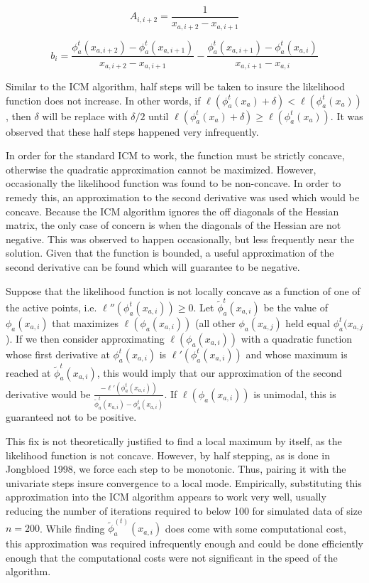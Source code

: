 \documentclass[10pt]{article}
\begin{document}
	\[ A_{i, i + 2} = \frac{1}{x_{a,i+2} - x_{a,i + 1} }
	\]
	
	\[ b_i = \frac{ \phi_a^{t}(x_{a, i + 2}) - \phi_a^{t}(x_{a, i + 1}) } {x_{a, i+2} - x_{a, i+1} }  -  \frac{ \phi_a^{t}(x_{a, i + 1}) - \phi_a^{t}(x_{a, i }) } {x_{a, i+1} - x_{a, i} } 
	\]
	
	Similar to the ICM algorithm, half steps will be taken to insure the likelihood function does not increase. In other words, if $\ell ( \phi^{t}_a(x_a) + \delta ) < \ell ( \phi^{t}_a(x_a) ) $, then $\delta$ will be replace with $\delta/2$ until $\ell ( \phi^{t}_a(x_a) + \delta ) \geq \ell ( \phi^{t}_a(x_a) )$. It was observed that these half steps happened very infrequently.
	
	
	
	In order for the standard ICM to work, the function must be strictly concave, otherwise the quadratic approximation cannot be maximized. However, occasionally the likelihood function was found to be non-concave. In order to remedy this, an approximation to the second derivative was used which would be concave. Because the ICM algorithm ignores the off diagonals of the Hessian matrix, the only case of concern is when the diagonals of the Hessian are not negative. This was observed to happen occasionally, but less frequently near the solution. Given that the function is bounded, a useful approximation of the second derivative can be found which will guarantee to be negative. 
	
	Suppose that the likelihood function is not locally concave as a function of one of the active points, i.e. $ \ell''(\phi_a^{t}(x_{a,i})) \geq 0$. Let $\tilde\phi_a^{t}(x_{a,i})$ be the value of $\phi_a(x_{a,i})$ that maximizes $\ell(\phi_a(x_{a,i}))$ (all other $\phi_a(x_{a,j})$ held equal $\phi_a^{t}(x_{a,j} $). If we then consider approximating $\ell(\phi_a(x_{a,i}))$ with a quadratic function whose first derivative at $\phi_a^{t}(x_{a,i})$ is $\ell'(\phi_a^{t}(x_{a,i}) ) $ and whose maximum is reached at $\tilde\phi_a^{t}(x_{a,i})$, this would imply that our approximation of the second derivative would be $\frac{-\ell'(\phi_a^{t}(x_{a,i}) )} {\tilde\phi_a^{t}(x_{a,i}) -\phi_a^{t}(x_{a,i})}$. If $\ell(\phi_a(x_{a,i}))$ is unimodal, this is guaranteed not to be positive. 
	
	This fix is not theoretically justified to find a local maximum by itself, as the likelihood function is not concave. However, by half stepping, as is done in Jongbloed 1998, we force each step to be monotonic. Thus, pairing it with the univariate steps insure convergence to a local mode. Empirically, substituting this approximation into the ICM algorithm appears to work very well, usually reducing the number of iterations required to below 100 for simulated data of size $n = 200$. While finding $\tilde\phi_a^{(t)}(x_{a,i})$ does come with some computational cost, this approximation was required infrequently enough and could be done efficiently enough that the computational costs were not significant in the speed of the algorithm. 
	
\end{document}
